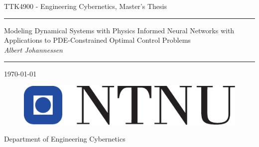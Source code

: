 

\newcommand{\HRule}{\rule{\linewidth}{1mm}}
\vspace*{5\baselineskip}

\begin{center}
TTK4900 - Engineering Cybernetics, Master's Thesis
\end{center}

\noindent\HRule
\begin{center}
  \huge
  \noindent Modeling Dynamical Systems with Physics Informed Neural Networks with Applications to PDE-Constrained Optimal Control Problems
  \\ [7mm]
  \large
  \noindent\emph{Albert Johannessen}
\end{center}
\noindent\HRule


\begin{center}
\today
\end{center}

\vspace*{\fill}
\begin{center}
\begin{figure}[h]
    \centering
    \includegraphics{Figures/Misc/ntnu_uten_slagord.pdf}
\end{figure}
\Large{Department of Engineering Cybernetics}
\end{center}
\restoregeometry

